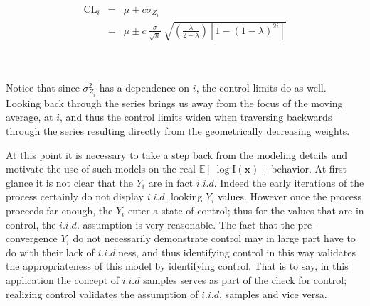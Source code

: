 \documentclass[12pt]{article}
\newcommand{\E}[1]{
        \mathbb{E}\left[~#1~\right]
}
\def \ix {
	\text{I}(\bm{x})
}
\begin{document}
	\begin{eqnarray}
	\text{CL}_i &=& \mu \pm c \sigma_{Z_i}\nonumber\\
	&=&  \mu \pm c ~ \frac{\sigma}{\sqrt{n}}~\sqrt{\left(\frac{\lambda}{2-\lambda}\right)\left[1-(1-\lambda)^{2i}\right]}
	\label{EWMACL}
	\end{eqnarray}
	
	$~$\\\\
	Notice that since $\sigma^2_{Z_i}$ has a dependence on $i$, the control limits do as well.
	Looking back through the series brings us away from the focus of the moving average, at $i$, and thus the control limits widen when traversing backwards through the series resulting directly from the geometrically decreasing weights.  
	
	
	At this point it is necessary to take a step back from the modeling details and motivate the use of such models on the real $\E{\log\ix}$ behavior.
	At first glance it is not clear that the $Y_i$ are in fact $i.i.d$. %
	Indeed the early iterations of the process certainly do not display $i.i.d.$ looking $Y_i$ values.
	However once the process proceeds far enough, the $Y_i$ enter a state of control; thus for the values that are in control, the $i.i.d.$ assumption is very reasonable.
	The fact that the pre-convergence $Y_i$ do not necessarily demonstrate control may in large part have to do with their lack of $i.i.d.$ness, and thus identifying control in this way validates the appropriateness of this model by identifying control. %
	That is to say, in this application the concept of $i.i.d$ samples serves as part of the check for control; realizing control validates the assumption of $i.i.d.$ samples and vice versa.
	
\end{document}
